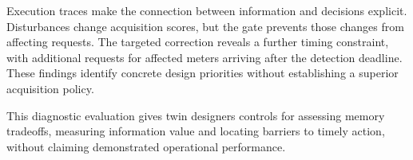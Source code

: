 \documentclass[conference]{IEEEtran}
\begin{document}
Execution traces make the connection between information and decisions explicit. Disturbances change acquisition scores, but the gate prevents those changes from affecting requests. The targeted correction reveals a further timing constraint, with additional requests for affected meters arriving after the detection deadline. These findings identify concrete design priorities without establishing a superior acquisition policy.

This diagnostic evaluation gives twin designers controls for assessing memory tradeoffs, measuring information value and locating barriers to timely action, without claiming demonstrated operational performance.







\end{document}
